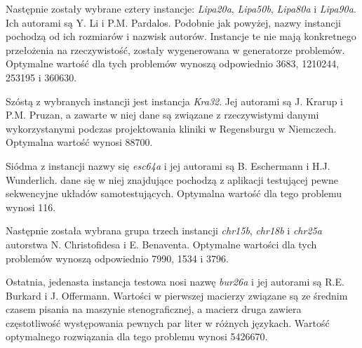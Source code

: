 Następnie zostały wybrane cztery instancje: \textit{Lipa20a}, \textit{Lipa50b}, \textit{Lipa80a} i \textit{Lipa90a}. Ich autorami są Y. Li i P.M. Pardalos. Podobnie jak powyżej, nazwy instancji pochodzą od ich rozmiarów i nazwisk autorów. Instancje te nie mają konkretnego przełożenia na rzeczywistość, zostały wygenerowana w generatorze problemów. Optymalne wartość dla tych problemów wynoszą odpowiednio 3683, 1210244, 253195 i 360630.

Szóstą z wybranych instancji jest instancja \textit{Kra32}. Jej autorami są J. Krarup i P.M. Pruzan, a zawarte w niej dane są związane z rzeczywistymi danymi wykorzystanymi podczas projektowania kliniki w Regensburgu w Niemczech. Optymalna wartość wynosi 88700.

Siódma z instancji nazwy się \textit{esc64a} i jej autorami są B. Eschermann i H.J. Wunderlich. dane się w niej znajdujące pochodzą z aplikacji testującej pewne sekwencyjne układów samotestujących. Optymalna wartość dla tego problemu wynosi 116.

Następnie została wybrana grupa trzech instancji \textit{chr15b}, \textit{chr18b} i \textit{chr25a} autorstwa N. Christofidesa i E. Benaventa. Optymalne wartości dla tych problemów wynoszą odpowiednio 7990, 1534 i 3796.

Ostatnia, jedenasta instancja testowa nosi nazwę \textit{bur26a} i jej autorami są R.E. Burkard i J. Offermann. Wartości w pierwszej macierzy związane są ze średnim czasem pisania na maszynie stenograficznej, a macierz druga zawiera częstotliwość występowania pewnych par liter w różnych językach. Wartość optymalnego rozwiązania dla tego problemu wynosi 5426670.
 
